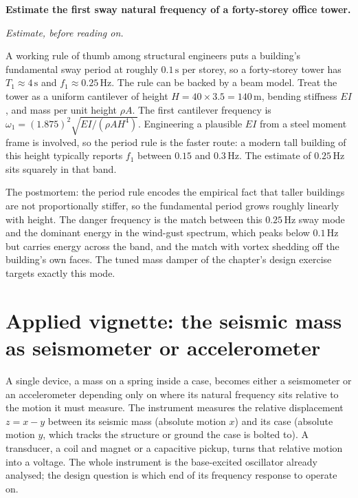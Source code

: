 \begin{estimation}
\textbf{Estimate the first sway natural frequency of a forty-storey
office tower.}

\smallskip
\textit{Estimate, before reading on.}

\smallskip
A working rule of thumb among structural engineers puts a building's
fundamental sway period at roughly $0.1\,\si{\second}$ per storey, so
a forty-storey tower has $T_1 \approx 4\,\si{\second}$ and $f_1
\approx 0.25\,\si{\hertz}$. The rule can be backed by a beam model.
Treat the tower as a uniform cantilever of height $H = 40 \times 3.5 =
140\,\si{\meter}$, bending stiffness $EI$, and mass per unit height
$\rho A$. The first cantilever frequency is $\omega_1 = (1.875)^2
\sqrt{EI/(\rho A H^4)}$. Engineering a plausible $EI$ from a steel
moment frame is involved, so the period rule is the faster route: a
modern tall building of this height typically reports $f_1$ between
$0.15$ and $0.3\,\si{\hertz}$. The estimate of $0.25\,\si{\hertz}$
sits squarely in that band.

\smallskip
The postmortem: the period rule encodes the empirical fact that
taller buildings are not proportionally stiffer, so the fundamental
period grows roughly linearly with height. The danger frequency is
the match between this $0.25\,\si{\hertz}$ sway mode and the dominant
energy in the wind-gust spectrum, which peaks below $0.1\,\si{\hertz}$
but carries energy across the band, and the match with vortex
shedding off the building's own faces. The tuned mass damper of the
chapter's design exercise targets exactly this mode.
\end{estimation}

\section{Applied vignette: the seismic mass as seismometer or
accelerometer}

A single device, a mass on a spring inside a case, becomes either a
seismometer or an accelerometer depending only on where its natural
frequency sits relative to the motion it must measure. The instrument
measures the relative displacement $z = x - y$ between its seismic mass
(absolute motion $x$) and its case (absolute motion $y$, which tracks
the structure or ground the case is bolted to). A transducer, a coil
and magnet or a capacitive pickup, turns that relative motion into a
voltage. The whole instrument is the base-excited oscillator already
analysed; the design question is which end of its frequency response to
operate on.

